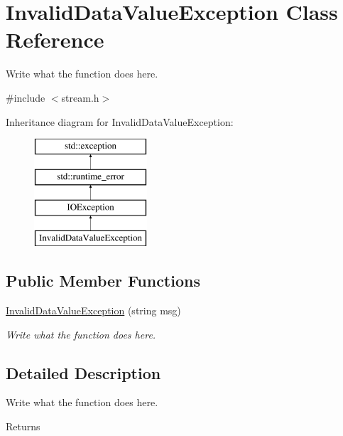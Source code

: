 \hypertarget{classInvalidDataValueException}{\section{Invalid\+Data\+Value\+Exception Class Reference}
\label{classInvalidDataValueException}
}


Write what the function does here.  




{\ttfamily \#include $<$stream.\+h$>$}

Inheritance diagram for Invalid\+Data\+Value\+Exception\+:\begin{figure}[H]
\begin{center}
\leavevmode
\includegraphics[height=4.000000cm]{classInvalidDataValueException}
\end{center}
\end{figure}
\subsection*{Public Member Functions}
\begin{DoxyCompactItemize}
\item 
\hyperlink{classInvalidDataValueException_a7f19492afda3de435899cce6c3b079ac}{Invalid\+Data\+Value\+Exception} (string msg)
\begin{DoxyCompactList}\small\item\em Write what the function does here. \end{DoxyCompactList}\end{DoxyCompactItemize}


\subsection{Detailed Description}
Write what the function does here. 

\begin{DoxyReturn}{Returns}

\end{DoxyReturn}


